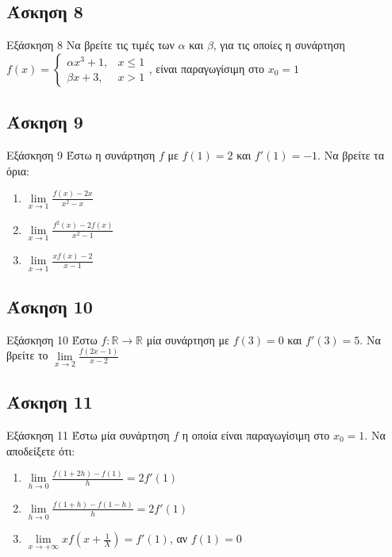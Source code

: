 \documentclass[greek]{beamer}
\begin{document}
\subsection{Άσκηση 8}
\begin{frame}{Εξάσκηση 8}
 Να βρείτε τις τιμές των $α$ και $β$, για τις οποίες η συνάρτηση
 $f(x)=\begin{cases}
   αx^3+1, & x\le 1 \\
   βx+3,   & x >1
  \end{cases}$, είναι παραγωγίσιμη στο $x_0=1$
\end{frame}

\subsection{Άσκηση 9}
\begin{frame}[label=Άσκηση9]{Εξάσκηση 9}
 Έστω η συνάρτηση $f$ με $f(1)=2$ και $f'(1)=-1$. Να βρείτε τα όρια:
 \begin{enumerate}
  \item<1-> $\lim\limits_{x \to 1}{ \frac{f(x)-2x}{x^2-x}}$
  \item<2-> $\lim\limits_{x \to 1}{ \frac{f^2(x)-2f(x)}{x^2-1}}$
  \item<3-> $\lim\limits_{x \to 1}{ \frac{xf(x)-2}{x-1}}$
 \end{enumerate}

\end{frame}

\subsection{Άσκηση 10}
\begin{frame}[label=Άσκηση10]{Εξάσκηση 10}
 Έστω $f:\mathbb{R}\to\mathbb{R}$ μία συνάρτηση με $f(3)=0$ και $f'(3)=5$. Να βρείτε το $\lim\limits_{x \to 2}{ \frac{f(2x-1)}{x-2} }$

\end{frame}

\subsection{Άσκηση 11}
\begin{frame}[label=Άσκηση11]{Εξάσκηση 11}
 Έστω μία συνάρτηση $f$ η οποία είναι παραγωγίσιμη στο $x_0=1$. Να αποδείξετε ότι:
 \begin{enumerate}
  \item<1-> $\lim\limits_{h \to 0}{ \frac{f(1+2h)-f(1)}{h} }=2f'(1)$
  \item<2-> $\lim\limits_{h \to 0}{ \frac{f(1+h)-f(1-h)}{h} }=2f'(1)$
  \item<3-> $\lim\limits_{x \to +\infty}{ xf\left( x+\frac{1}{X} \right) }=f'(1)$, αν $f(1)=0$
 \end{enumerate}

\end{frame}
\end{document}
